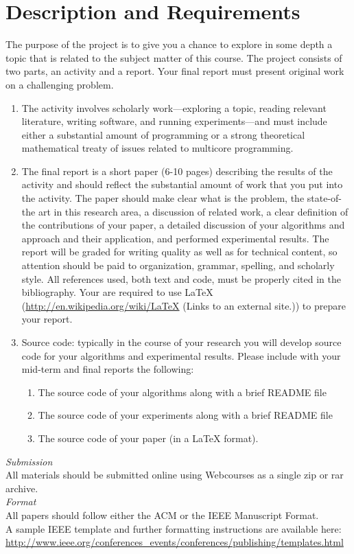 \documentclass{article}
\begin{document}
\section{Description and Requirements}
The purpose of the project is to give you a chance to explore in some depth a topic that is related to the subject matter of this course. The project consists of two parts, an activity and a report. Your final report must present original work on a challenging problem.
\begin{enumerate}
    \item The activity involves scholarly work—exploring a topic, reading relevant literature, writing software, and running experiments—and must include either a substantial amount of programming or a strong theoretical mathematical treaty of issues related to multicore programming.
    \item The final report is a short paper (6-10 pages) describing the results of the activity and should reflect the substantial amount of work that you put into the activity. The paper should make clear what is the problem, the state-of-the art in this research area, a discussion of related work, a clear definition of the contributions of your paper, a detailed discussion of your algorithms and approach and their application, and performed experimental results. The report will be graded for writing quality as well as for technical content, so attention should be paid to organization, grammar, spelling, and scholarly style. All references used, both text and code, must be properly cited in the bibliography. Your are required to use LaTeX (\url{http://en.wikipedia.org/wiki/LaTeX} (Links to an external site.)) to prepare your report.
    \item Source code: typically in the course of your research you will develop source code for your algorithms and experimental results. Please include with your mid-term and final reports the following:
    \begin{enumerate}
        \item The source code of your algorithms along with a brief README file
        \item The source code of your experiments along with a brief README file
        \item The source code of your paper (in a LaTeX format).
    \end{enumerate}
\end{enumerate}
\textit{Submission} \\
All materials should be submitted online using Webcourses as a single zip or rar archive. \\
\textit{Format} \\
All papers should follow either the ACM or the IEEE Manuscript Format. \\
A sample IEEE template and further formatting instructions are available here: \\
\url{http://www.ieee.org/conferences_events/conferences/publishing/templates.html}
\end{document}
